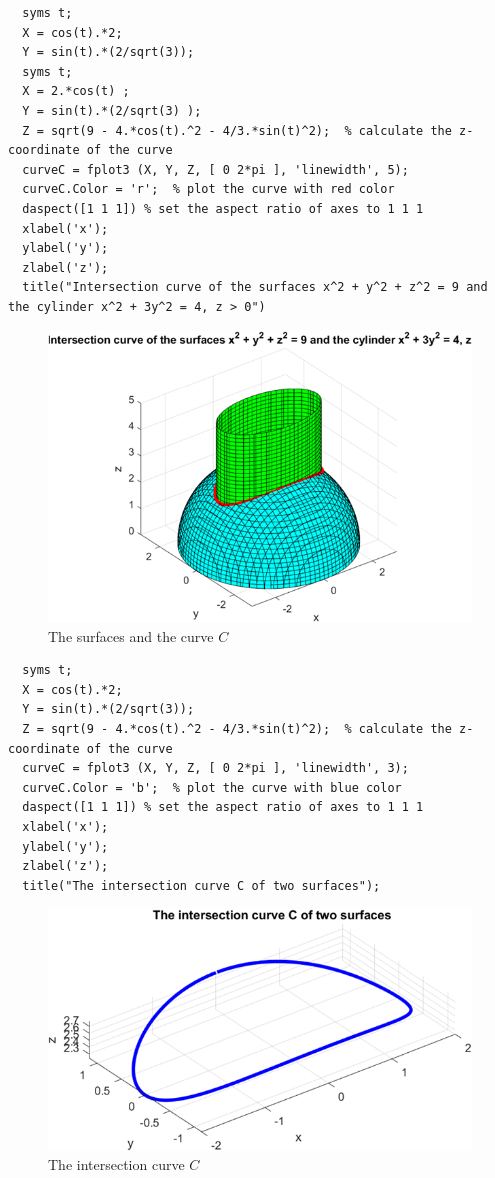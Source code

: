\begin{lstlisting}[style=Matlab-editor]
  % Draw the curve C as the interection of 2 surfaces:
  syms t;
  X = cos(t).*2;
  Y = sin(t).*(2/sqrt(3));
  syms t;
  X = 2.*cos(t) ;
  Y = sin(t).*(2/sqrt(3) );
  Z = sqrt(9 - 4.*cos(t).^2 - 4/3.*sin(t)^2);  % calculate the z-coordinate of the curve
  curveC = fplot3 (X, Y, Z, [ 0 2*pi ], 'linewidth', 5);
  curveC.Color = 'r';  % plot the curve with red color
  daspect([1 1 1]) % set the aspect ratio of axes to 1 1 1
  xlabel('x');
  ylabel('y');
  zlabel('z');
  title("Intersection curve of the surfaces x^2 + y^2 + z^2 = 9 and the cylinder x^2 + 3y^2 = 4, z > 0")   
\end{lstlisting}

\begin{figure}[H]
  \centering
  \includegraphics[width=12cm]{graphics/3a3.png}
  \caption{The surfaces and the curve $C$}
\end{figure}

\begin{lstlisting}[style=Matlab-editor]
  % Draw the curve C as the interection of 2 surfaces without line:
  syms t;
  X = cos(t).*2;
  Y = sin(t).*(2/sqrt(3));
  Z = sqrt(9 - 4.*cos(t).^2 - 4/3.*sin(t)^2);  % calculate the z-coordinate of the curve
  curveC = fplot3 (X, Y, Z, [ 0 2*pi ], 'linewidth', 3);
  curveC.Color = 'b';  % plot the curve with blue color
  daspect([1 1 1]) % set the aspect ratio of axes to 1 1 1
  xlabel('x');
  ylabel('y');
  zlabel('z');
  title("The intersection curve C of two surfaces"); 
\end{lstlisting}

\begin{figure}[H]
  \centering
  \includegraphics[width=12cm]{graphics/3a4.png}
  \caption{The intersection curve $C$}
\end{figure}


